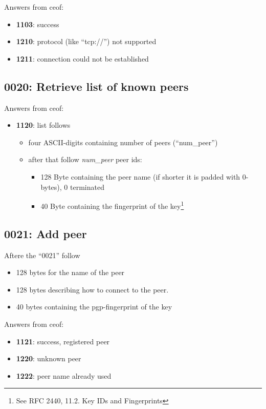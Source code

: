 \documentclass[12pt,a4paper]{article}
\begin{document}
Answers from ceof:
\begin{itemize}
\item \textbf{1103}: success
\item \textbf{1210}: protocol (like "`tcp://"') not supported
\item \textbf{1211}: connection could not be established
\end{itemize}
\subsection{0020: Retrieve list of known peers}
Answers from ceof:
\begin{itemize}
\item \textbf{1120}: list follows
\begin{itemize}
\item four ASCII-digits containing number of peers ("`num\_peer"')
\item after that follow \textit{num\_peer} peer ids:
\begin{itemize}
\item 128 Byte containing the peer name (if shorter it is padded with 0-bytes), 0 terminated
\item 40 Byte containing the fingerprint of the
key\footnote{See RFC 2440, 11.2. Key IDs and Fingerprints}
\end{itemize}
\end{itemize}
\end{itemize}
\subsection{0021: Add peer}
Aftere the "`0021"' follow

\begin{itemize}
\item 128 bytes for the name of the peer
\item 128 bytes describing how to connect to the peer.
\item 40 bytes  containing the pgp-fingerprint of the key
\end{itemize}
Answers from ceof:
\begin{itemize}
\item \textbf{1121}: success, registered peer
\item \textbf{1220}: unknown peer
\item \textbf{1222}: peer name already used
\end{itemize}
\end{document}
